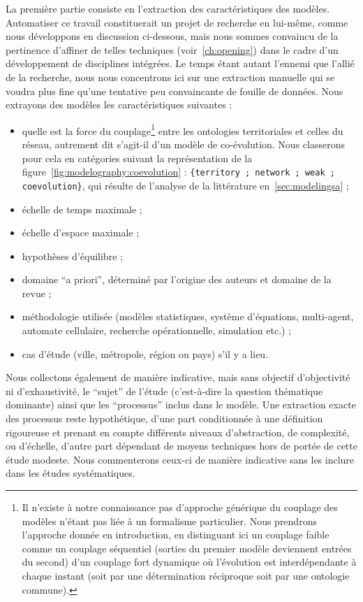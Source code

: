 La première partie consiste en l'extraction des caractéristiques des modèles. Automatiser ce travail constituerait un projet de recherche en lui-même, comme nous développons en discussion ci-dessous, mais nous sommes convaincu de la pertinence d'affiner de telles techniques (voir~\ref{ch:opening}) dans le cadre d'un développement de disciplines intégrées. Le temps étant autant l'ennemi que l'allié de la recherche, nous nous concentrons ici sur une extraction manuelle qui se voudra plus fine qu'une tentative peu convaincante de fouille de données. Nous extrayons des modèles les caractéristiques suivantes :

\begin{itemize}
\item quelle est la force du couplage\footnote{Il n'existe à notre connaissance pas d'approche générique du couplage des modèles n'étant pas liée à un formalisme particulier. Nous prendrons l'approche donnée en introduction, en distinguant ici un couplage faible comme un couplage séquentiel (sorties du premier modèle deviennent entrées du second) d'un couplage fort dynamique où l'évolution est interdépendante à chaque instant (soit par une détermination réciproque soit par une ontologie commune).} entre les ontologies territoriales et celles du réseau, autrement dit s'agit-il d'un modèle de co-évolution. Nous classerons pour cela en catégories suivant la représentation de la figure~\ref{fig:modelography:coevolution} : \texttt{\{territory ; network ; weak ; coevolution\}}, qui résulte de l'analyse de la littérature en~\ref{sec:modelingsa} ;
\item échelle de temps maximale ; %
\item échelle d'espace maximale ; %
\item hypothèses d'équilibre ;
\item domaine ``a priori'', déterminé par l'origine des auteurs et domaine de la revue ;
\item méthodologie utilisée (modèles statistiques, système d'équations, multi-agent, automate cellulaire, recherche opérationnelle, simulation etc.) ;
\item cas d'étude (ville, métropole, région ou pays) s'il y a lieu.
\end{itemize}

Nous collectons également de manière indicative, mais sans objectif d'objectivité ni d'exhaustivité, le ``sujet'' de l'étude (c'est-à-dire la question thématique dominante) ainsi que les ``processus'' inclus dans le modèle. Une extraction exacte des processus reste hypothétique, d'une part conditionnée à une définition rigoureuse et prenant en compte différents niveaux d'abstraction, de complexité, ou d'échelle, d'autre part dépendant de moyens techniques hors de portée de cette étude modeste. Nous commenterons ceux-ci de manière indicative sans les inclure dans les études systématiques.


